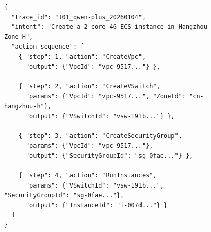 \documentclass{article}
\theoremstyle{plain}
\theoremstyle{definition}
\theoremstyle{remark}
\begin{document}
\begin{figure}[h!]
\begin{minipage}{\linewidth}
\small
\begin{verbatim}
{
  "trace_id": "T01_qwen-plus_20260104",
  "intent": "Create a 2-core 4G ECS instance in Hangzhou Zone H",
  "action_sequence": [
    { "step": 1, "action": "CreateVpc", 
      "output": {"VpcId": "vpc-9517..."} },
      
    { "step": 2, "action": "CreateVSwitch", 
      "params": {"VpcId": "vpc-9517...", "ZoneId": "cn-hangzhou-h"},
      "output": {"VSwitchId": "vsw-191b..."} },
      
    { "step": 3, "action": "CreateSecurityGroup", 
      "params": {"VpcId": "vpc-9517..."},
      "output": {"SecurityGroupId": "sg-0fae..."} },
      
    { "step": 4, "action": "RunInstances", 
      "params": {"VSwitchId": "vsw-191b...", "SecurityGroupId": "sg-0fae..."},
      "output": {"InstanceId": "i-007d..."} }
  ]
}
\end{verbatim}
\label{lst:trace_example}
\end{minipage}
\end{figure}
\end{document}
